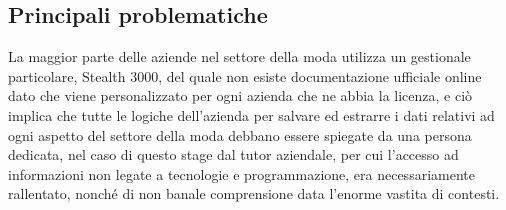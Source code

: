 \subsection{Principali problematiche}
La maggior parte delle aziende nel settore della moda utilizza un gestionale particolare, Stealth 3000, del quale non esiste documentazione ufficiale online dato che viene personalizzato per ogni azienda che ne abbia la licenza, e ciò implica che tutte le logiche dell'azienda per salvare ed estrarre i dati relativi ad ogni aspetto del settore della moda debbano essere spiegate da una persona dedicata, nel caso di questo stage dal tutor aziendale, per cui l'accesso ad informazioni non legate a tecnologie e programmazione, era necessariamente rallentato, nonché di non banale comprensione data l'enorme vastita di contesti.
